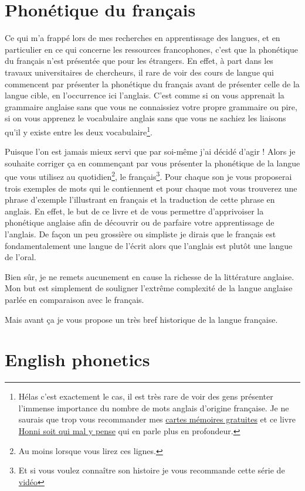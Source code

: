 \documentclass[12pt,a4paper]{book}
\begin{document}
\part{Phonétique du français}
Ce qui m'a frappé lors de mes recherches en apprentissage des langues,
et en particulier en ce qui concerne les ressources francophones,
c'est que la phonétique du français n'est présentée que pour les
étrangers. En effet, à part dans les travaux universitaires de
chercheurs, il rare de voir des cours de langue qui commencent par
présenter la phonétique du français avant de présenter celle de la
langue cible, en l'occurrence ici l'anglais. C'est comme si on vous
apprenait la grammaire anglaise sans que vous ne connaissiez votre
propre grammaire ou pire, si on vous apprenez le vocabulaire anglais
sans que vous ne sachiez les liaisons qu'il y existe entre les deux
vocabulaire\footnote{Hélas c'est exactement le cas, il est très rare
  de voir des gens présenter l'immense importance du nombre de mots
  anglais d'origine française. Je ne saurais que trop vous recommander
mes
\href{https://tinycards.duolingo.com/decks/6VNKUdba/english-words-with-french-origin}{cartes
  mémoires gratuites} et ce livre
\href{https://www.amazon.fr/gp/product/225315444X/ref=as_li_tl?ie=UTF8&camp=1642&creative=6746&creativeASIN=225315444X&linkCode=as2&tag=wwwbecomefree-21&linkId=5317e7b0e063b4d6c7c676b11420e49d}{Honni
  soit qui mal y pense} qui en parle plus en profondeur.}.\par
Puisque l'on est jamais mieux servi que par soi-même j'ai décidé
d'agir ! Alors je souhaite corriger ça en commençant par vous
présenter la phonétique de la langue que vous utilisez au
quotidien\footnote{Au moins lorsque vous lirez ces lignes.}, le
français\footnote{Et si vous voulez connaître son histoire je vous
  recommande cette série de \href{https://www.youtube.com/watch?v=rHSIPt_ehvc&list=PLH2hhYn999aRfv2odG4SozTXCHbZaX_ji}{vidéo}}. Pour
chaque son je vous proposerai trois exemples de mots qui le
contiennent et pour chaque mot vous trouverez une phrase d'exemple
l'illustrant en français et la traduction de cette phrase en
anglais. En effet, le but de ce livre et de vous permettre
d'apprivoiser la phonétique anglaise afin de découvrir ou de parfaire
votre apprentissage de l'anglais. De façon un peu grossière ou
simpliste je dirais que le français est fondamentalement une langue de
l'écrit alors que l'anglais est plutôt une langue de l'oral.\par
Bien sûr, je ne remets aucunement en cause la richesse de la
littérature anglaise. Mon but est simplement de souligner l'extrême
complexité de la langue anglaise parlée en comparaison avec le
français.\par
Mais avant ça je vous propose un très bref historique de la langue
française.

%

%

%

\part{English phonetics}

\parttoc




\end{document}
